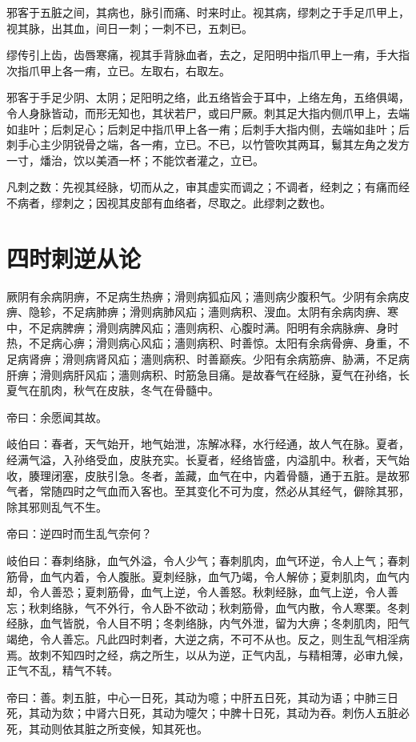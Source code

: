 \documentclass{article}%
\begin{document}
邪客于五脏之间，其病也，脉引而痛、时来时止。视其病，缪刺之于手足爪甲上，视其脉，出其血，间日一刺；一刺不已，五刺已。

缪传引上齿，齿唇寒痛，视其手背脉血者，去之，足阳明中指爪甲上一痏，手大指次指爪甲上各一痏，立已。左取右，右取左。

邪客于手足少阴、太阴；足阳明之络，此五络皆会于耳中，上络左角，五络俱竭，令人身脉皆动，而形无知也，其状若尸，或曰尸厥。刺其足大指内侧爪甲上，去端如韭叶；后刺足心；后刺足中指爪甲上各一痏；后刺手大指内侧，去端如韭叶；后刺手心主少阴锐骨之端，各一痏，立已。不已，以竹管吹其两耳，鬄其左角之发方一寸，燔治，饮以美酒一杯；不能饮者灌之，立已。

凡刺之数：先视其经脉，切而从之，审其虚实而调之；不调者，经刺之；有痛而经不病者，缪刺之；因视其皮部有血络者，尽取之。此缪刺之数也。
\section{四时刺逆从论}
厥阴有余病阴痹，不足病生热痹；滑则病狐疝风；濇则病少腹积气。少阴有余病皮痹、隐轸，不足病肺痹；滑则病肺风疝；濇则病积、溲血。太阴有余病肉痹、寒中，不足病脾痹；滑则病脾风疝；濇则病积、心腹时满。阳明有余病脉痹、身时热，不足病心痹；滑则病心风疝；濇则病积、时善惊。太阳有余病骨痹、身重，不足病肾痹；滑则病肾风疝；濇则病积、时善巅疾。少阳有余病筋痹、胁满，不足病肝痹；滑则病肝风疝；濇则病积、时筋急目痛。是故春气在经脉，夏气在孙络，长夏气在肌肉，秋气在皮肤，冬气在骨髓中。

帝曰：余愿闻其故。

岐伯曰：春者，天气始开，地气始泄，冻解冰释，水行经通，故人气在脉。夏者，经满气溢，入孙络受血，皮肤充实。长夏者，经络皆盛，内溢肌中。秋者，天气始收，腠理闭塞，皮肤引急。冬者，盖藏，血气在中，内着骨髓，通于五脏。是故邪气者，常随四时之气血而入客也。至其变化不可为度，然必从其经气，僻除其邪，除其邪则乱气不生。

帝曰：逆四时而生乱气奈何？

岐伯曰：春刺络脉，血气外溢，令人少气；春刺肌肉，血气环逆，令人上气；春刺筋骨，血气内着，令人腹胀。夏刺经脉，血气乃竭，令人解㑊；夏刺肌肉，血气内却，令人善恐；夏刺筋骨，血气上逆，令人善怒。秋刺经脉，血气上逆，令人善忘；秋刺络脉，气不外行，令人卧不欲动；秋刺筋骨，血气内散，令人寒栗。冬刺经脉，血气皆脱，令人目不明；冬刺络脉，内气外泄，留为大痹；冬刺肌肉，阳气竭绝，令人善忘。凡此四时刺者，大逆之病，不可不从也。反之，则生乱气相淫病焉。故刺不知四时之经，病之所生，以从为逆，正气内乱，与精相薄，必审九候，正气不乱，精气不转。

帝曰：善。刺五脏，中心一日死，其动为噫；中肝五日死，其动为语；中肺三日死，其动为欬；中肾六日死，其动为嚏欠；中脾十日死，其动为吞。刺伤人五脏必死，其动则依其脏之所变候，知其死也。
\end{document}
